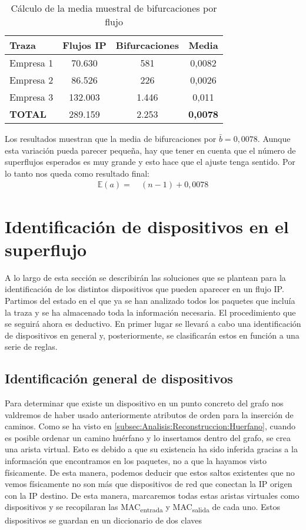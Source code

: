 \documentclass[twoside, 12pt]{epstfg}
\begin{document}
\begin{table}[hbtp]
	\centering
	\begin{tabular}{lccc}
		\toprule \textbf{Traza} & \textbf{Flujos IP}  & \textbf{Bifurcaciones} & \textbf{Media} \\ 
		\midrule
		Empresa 1 & 70.630 & 581 & 0,0082 \\
		Empresa 2 & 86.526 & 226 & 0,0026 \\
		Empresa 3 & 132.003 & 1.446 & 0,011 \\
		\textbf{TOTAL} & 289.159 & 2.253 & \textbf{0,0078} \\
		\bottomrule
	\end{tabular}
	\caption{Cálculo de la media muestral de bifurcaciones por flujo}
	\label{tab:Analisis:Media bifurcaciones}
\end{table}

Los resultados muestran que la media de bifurcaciones por $\bar{b} = 0,0078$. Aunque esta variación pueda parecer pequeña, hay que tener en cuenta que el número de superflujos esperados es muy grande y esto hace que el ajuste tenga sentido. Por lo tanto nos queda como resultado final:
\begin{align*}
 \mathbb{E}(a) =&\ (n - 1) + 0,0078
\end{align*}

\section{Identificación de dispositivos en el superflujo}
\label{sec:Analisis:Dispositivos}
A lo largo de esta sección se describirán las soluciones que se plantean para la identificación de los distintos dispositivos que pueden aparecer en un flujo IP. Partimos del estado en el que ya se han analizado todos los paquetes que incluía la traza y se ha almacenado toda la información necesaria. El procedimiento que se seguirá ahora es deductivo. En primer lugar se llevará a cabo una identificación de dispositivos en general y, posteriormente, se clasificarán estos en función a una serie de reglas.

\subsection{Identificación general de dispositivos}
Para determinar que existe un dispositivo en un punto concreto del grafo nos valdremos de haber usado anteriormente atributos de orden para la inserción de caminos. Como se ha visto en \ref{subsec:Analisis:Reconstruccion:Huerfano}, cuando es posible ordenar un camino huérfano y lo insertamos dentro del grafo, se crea una arista virtual. Esto es debido a que su existencia ha sido inferida gracias a la información que encontramos en los paquetes, no a que la hayamos visto físicamente. De esta manera, podemos deducir que estos saltos existentes que no vemos físicamente no son más que dispositivos de red que conectan la IP origen con la IP destino. De esta manera, marcaremos todas estas aristas virtuales como dispositivos y se recopilaran las MAC\textsubscript{entrada} y MAC\textsubscript{salida} de cada uno. Estos dispositivos se guardan en un diccionario de dos claves
\end{document}
